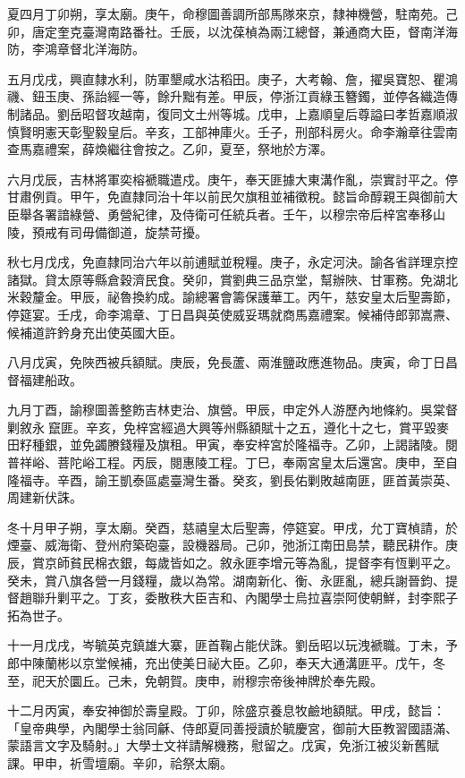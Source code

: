 \begin{pinyinscope}
夏四月丁卯朔，享太廟。庚午，命穆圖善調所部馬隊來京，隸神機營，駐南苑。己卯，唐定奎克臺灣南路番社。壬辰，以沈葆楨為兩江總督，兼通商大臣，督南洋海防，李鴻章督北洋海防。

五月戊戌，興直隸水利，防軍墾咸水沽稻田。庚子，大考翰、詹，擢吳寶恕、瞿鴻禨、鈕玉庚、孫詒經一等，餘升黜有差。甲辰，停浙江貢綠玉簪鐲，並停各織造傳制諸品。劉岳昭督攻越南，復同文土州等城。戊申，上嘉順皇后尊謚曰孝哲嘉順淑慎賢明憲天彰聖毅皇后。辛亥，工部神庫火。壬子，刑部科房火。命李瀚章往雲南查馬嘉禮案，薛煥繼往會按之。乙卯，夏至，祭地於方澤。

六月戊辰，吉林將軍奕榕褫職遣戍。庚午，奉天匪據大東溝作亂，崇實討平之。停甘肅例貢。甲午，免直隸同治十年以前民欠旗租並補徵稅。懿旨命醇親王與御前大臣舉各署諳綠營、勇營紀律，及侍衛可任統兵者。壬午，以穆宗帝后梓宮奉移山陵，預戒有司毋備御道，旋禁苛擾。

秋七月戊戌，免直隸同治六年以前逋賦並稅糧。庚子，永定河決。諭各省詳理京控諸獄。貸太原等縣倉穀濟民食。癸卯，賞劉典三品京堂，幫辦陜、甘軍務。免湖北米穀釐金。甲辰，祕魯換約成。諭總署會籌保護華工。丙午，慈安皇太后聖壽節，停筵宴。壬戌，命李鴻章、丁日昌與英使威妥瑪就商馬嘉禮案。候補侍郎郭嵩燾、候補道許鈐身充出使英國大臣。

八月戊寅，免陜西被兵額賦。庚辰，免長蘆、兩淮鹽政應進物品。庚寅，命丁日昌督福建船政。

九月丁酉，諭穆圖善整飭吉林吏治、旗營。甲辰，申定外人游歷內地條約。吳棠督剿敘永竄匪。辛亥，免梓宮經過大興等州縣額賦十之五，遵化十之七，賞平毀麥田籽種銀，並免蠲賸錢糧及旗租。甲寅，奉安梓宮於隆福寺。乙卯，上謁諸陵。閱普祥峪、菩陀峪工程。丙辰，閱惠陵工程。丁巳，奉兩宮皇太后還宮。庚申，至自隆福寺。辛酉，諭王凱泰區處臺灣生番。癸亥，劉長佑剿敗越南匪，匪首黃崇英、周建新伏誅。

冬十月甲子朔，享太廟。癸酉，慈禧皇太后聖壽，停筵宴。甲戌，允丁寶楨請，於煙臺、威海衛、登州府築砲臺，設機器局。己卯，弛浙江南田島禁，聽民耕作。庚辰，賞京師貧民棉衣銀，每歲皆如之。敘永匪李增元等為亂，提督李有恆剿平之。癸未，賞八旗各營一月錢糧，歲以為常。湖南新化、衡、永匪亂，總兵謝晉鈞、提督趙聯升剿平之。丁亥，委散秩大臣吉和、內閣學士烏拉喜崇阿使朝鮮，封李熙子拓為世子。

十一月戊戌，岑毓英克鎮雄大寨，匪首鞠占能伏誅。劉岳昭以玩洩褫職。丁未，予郎中陳蘭彬以京堂候補，充出使美日祕大臣。乙卯，奉天大通溝匪平。戊午，冬至，祀天於圜丘。己未，免朝賀。庚申，祔穆宗帝後神牌於奉先殿。

十二月丙寅，奉安神御於壽皇殿。丁卯，除盛京養息牧鹼地額賦。甲戌，懿旨：「皇帝典學，內閣學士翁同龢、侍郎夏同善授讀於毓慶宮，御前大臣教習國語滿、蒙語言文字及騎射。」大學士文祥請解機務，慰留之。戊寅，免浙江被災新舊賦課。甲申，祈雪壇廟。辛卯，祫祭太廟。


\end{pinyinscope}
